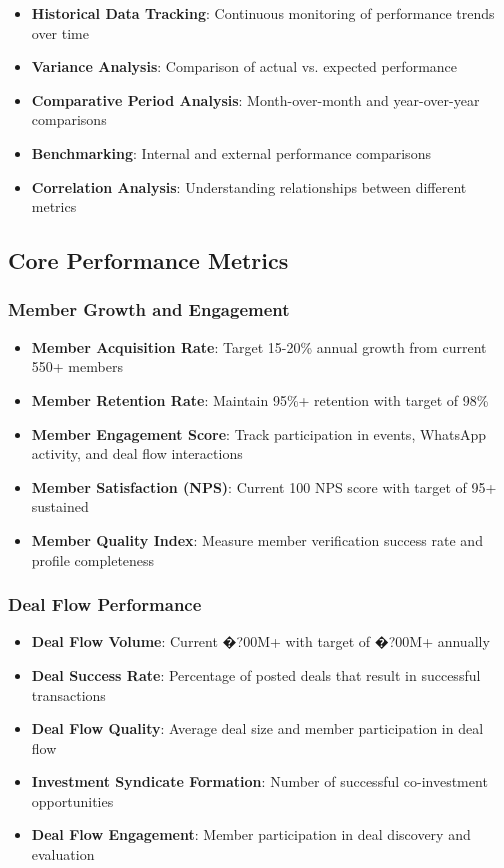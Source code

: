 \begin{itemize}
    \item \textbf{Historical Data Tracking}: Continuous monitoring of performance trends over time
    \item \textbf{Variance Analysis}: Comparison of actual vs. expected performance
    \item \textbf{Comparative Period Analysis}: Month-over-month and year-over-year comparisons
    \item \textbf{Benchmarking}: Internal and external performance comparisons
    \item \textbf{Correlation Analysis}: Understanding relationships between different metrics
\end{itemize}

\subsection{Core Performance Metrics}

\subsubsection{Member Growth and Engagement}
\begin{itemize}
    \item \textbf{Member Acquisition Rate}: Target 15-20\% annual growth from current 550+ members
    \item \textbf{Member Retention Rate}: Maintain 95\%+ retention with target of 98\%
    \item \textbf{Member Engagement Score}: Track participation in events, WhatsApp activity, and deal flow interactions
    \item \textbf{Member Satisfaction (NPS)}: Current 100 NPS score with target of 95+ sustained
    \item \textbf{Member Quality Index}: Measure member verification success rate and profile completeness
\end{itemize}

\subsubsection{Deal Flow Performance}
\begin{itemize}
    \item \textbf{Deal Flow Volume}: Current �?00M+ with target of �?00M+ annually
    \item \textbf{Deal Success Rate}: Percentage of posted deals that result in successful transactions
    \item \textbf{Deal Flow Quality}: Average deal size and member participation in deal flow
    \item \textbf{Investment Syndicate Formation}: Number of successful co-investment opportunities
    \item \textbf{Deal Flow Engagement}: Member participation in deal discovery and evaluation
\end{itemize}


